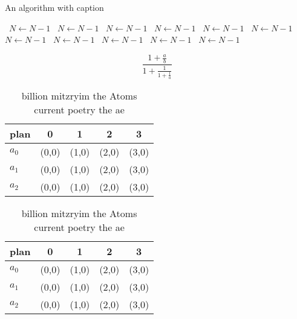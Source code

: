 \documentclass[a4paper]{article}
\begin{document}
\begin{algorithm}
\caption{An algorithm with caption}
\begin{algorithmic}
\    \State $N \gets N - 1$
\    \State $N \gets N - 1$
\    \State $N \gets N - 1$
\    \State $N \gets N - 1$
\    \State $N \gets N - 1$
\    \State $N \gets N - 1$
\    \State $N \gets N - 1$
\    \State $N \gets N - 1$
\    \State $N \gets N - 1$
\    \State $N \gets N - 1$
\    \State $N \gets N - 1$
\EndWhile
\end{algorithmic}
\end{algorithm}

\[ \frac{1+\frac{a}{b}}{1+\frac{1}{1+\frac{1}{a}}} \]

\begin{table}
\begin{adjustbox}{width=0.6\columnwidth}
\begin{tabular}{|l|l|l|l|l|}
\hline
\textbf{plan} & \multicolumn{1}{c|}{\textbf{0}} & \multicolumn{1}{c|}{\textbf{1}} & \multicolumn{1}{c|}{\textbf{2}} & \multicolumn{1}{c|}{\textbf{3}} \\ \hline
\textbf{$a_0$}  & (0,0) & (1,0) & (2,0) & (3,0) \\ \hline
\textbf{$a_1$}  & (0,0) & (1,0) & (2,0) & (3,0) \\ \hline
\textbf{$a_2$}  & (0,0) & (1,0) & (2,0) & (3,0) \\ \hline
\end{tabular}
\end{adjustbox}
\caption{ billion mitzryim the Atoms current poetry the ae
}
\end{table}

\begin{table}
\begin{adjustbox}{width=0.6\columnwidth}
\begin{tabular}{|l|l|l|l|l|}
\hline
\textbf{plan} & \multicolumn{1}{c|}{\textbf{0}} & \multicolumn{1}{c|}{\textbf{1}} & \multicolumn{1}{c|}{\textbf{2}} & \multicolumn{1}{c|}{\textbf{3}} \\ \hline
\textbf{$a_0$}  & (0,0) & (1,0) & (2,0) & (3,0) \\ \hline
\textbf{$a_1$}  & (0,0) & (1,0) & (2,0) & (3,0) \\ \hline
\textbf{$a_2$}  & (0,0) & (1,0) & (2,0) & (3,0) \\ \hline
\end{tabular}
\end{adjustbox}
\caption{ billion mitzryim the Atoms current poetry the ae
}
\end{table}
\end{document}

